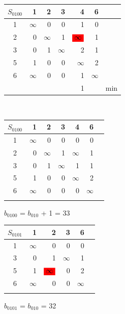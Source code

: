 \documentclass[12pt]{article}
\begin{document}
\begin{flushleft}
 \begin{tabular}{c||rrrrr||c}
$S_{0100}$ & 1 &2 & 3 & 4 & 6 & \\
\hline
\hline
1 & $\infty$ & 0 & 0 & 1  & 0 & \\
2 & 0 & $\infty$ & 1 & $\colorbox{red}{$\infty$}$  & 1 & \\
3 & 0 & 1 & $\infty$ & 2  & 1 & \\
5 & 1 & 0 & 0 & $\infty$  & 2 \\
6 & $\infty$ & 0 & 0 & 1 & $\infty$ & \\
\hline
\hline
 & &   &  & 1 &  &min \\
\end{tabular}
$\qquad $ 
 \begin{tabular}{c||rrrrr||c}
$S_{0100}$ & 1 &2 & 3 & 4 & 6 & \\
\hline
\hline
1 & $\infty$ & 0 & 0 & 0  & 0 & \\
2 & 0 & $\infty$ & 1 & $\infty$  & 1 & \\
3 & 0 & 1 & $\infty$ & 1  & 1 & \\
5 & 1 & 0 & 0 & $\infty$  & 2 \\
6 & $\infty$ & 0 & 0 & 0 & $\infty$ & \\
\hline
\hline
 & &   &  &  &  & \\
\end{tabular}
\end{flushleft}

$b_{0100}$ = $b_{010}$ + 1 = 33\\

\begin{flushleft}
 \begin{tabular}{c||rrrr||c}
$S_{0101}$ & 1 &2 & 3  & 6 & \\
\hline
\hline
1 & $\infty$ & 0 & 0   & 0 & \\
3 & 0 & 1 & $\infty$   & 1 & \\
5 & 1 &  $\colorbox{red}{$\infty$}$ &  0 & 2 &\\
6 & $\infty$ & 0 & 0  & $\infty$ & \\
\hline
\hline
 & &   &  &   & \\
\end{tabular}
\end{flushleft}

$b_{0101}$ = $b_{010}$ = 32\\
\end{document}
